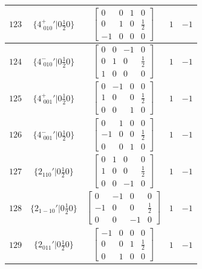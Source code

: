 \documentclass[fleqn,8pt]{jsarticle}
\begin{document}
\begin{longtable}{ccccc}
$ 123 $ & $ \{4^{+}_{\,\,010}{}'|0 \frac{1}{2} 0\} $ & $ \begin{bmatrix} 0 & 0 & 1 & 0 \\ 0 & 1 & 0 & \frac{1}{2} \\ -1 & 0 & 0 & 0 \end{bmatrix} $ & $ 1 $ & $ -1 $ \\ \hline
$ 124 $ & $ \{4^{-}_{\,\,010}{}'|0 \frac{1}{2} 0\} $ & $ \begin{bmatrix} 0 & 0 & -1 & 0 \\ 0 & 1 & 0 & \frac{1}{2} \\ 1 & 0 & 0 & 0 \end{bmatrix} $ & $ 1 $ & $ -1 $ \\ \hline
$ 125 $ & $ \{4^{+}_{\,\,001}{}'|0 \frac{1}{2} 0\} $ & $ \begin{bmatrix} 0 & -1 & 0 & 0 \\ 1 & 0 & 0 & \frac{1}{2} \\ 0 & 0 & 1 & 0 \end{bmatrix} $ & $ 1 $ & $ -1 $ \\ \hline
$ 126 $ & $ \{4^{-}_{\,\,001}{}'|0 \frac{1}{2} 0\} $ & $ \begin{bmatrix} 0 & 1 & 0 & 0 \\ -1 & 0 & 0 & \frac{1}{2} \\ 0 & 0 & 1 & 0 \end{bmatrix} $ & $ 1 $ & $ -1 $ \\ \hline
$ 127 $ & $ \{2{}_{110}{}'|0 \frac{1}{2} 0\} $ & $ \begin{bmatrix} 0 & 1 & 0 & 0 \\ 1 & 0 & 0 & \frac{1}{2} \\ 0 & 0 & -1 & 0 \end{bmatrix} $ & $ 1 $ & $ -1 $ \\ \hline
$ 128 $ & $ \{2{}_{1-10}{}'|0 \frac{1}{2} 0\} $ & $ \begin{bmatrix} 0 & -1 & 0 & 0 \\ -1 & 0 & 0 & \frac{1}{2} \\ 0 & 0 & -1 & 0 \end{bmatrix} $ & $ 1 $ & $ -1 $ \\ \hline
$ 129 $ & $ \{2{}_{011}{}'|0 \frac{1}{2} 0\} $ & $ \begin{bmatrix} -1 & 0 & 0 & 0 \\ 0 & 0 & 1 & \frac{1}{2} \\ 0 & 1 & 0 & 0 \end{bmatrix} $ & $ 1 $ & $ -1 $ \\ \hline

\end{longtable}
\end{document}
